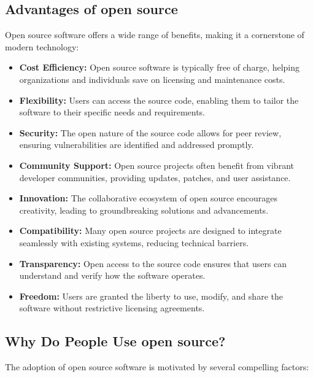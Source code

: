 \cite{opensource_what_is}

\subsection{Advantages of open source}

Open source software offers a wide range of benefits, making it a cornerstone of modern technology:

\begin{itemize}
    \item \textbf{Cost Efficiency:} Open source software is typically free of charge, helping organizations and individuals save on licensing and maintenance costs.
    \item \textbf{Flexibility:} Users can access the source code, enabling them to tailor the software to their specific needs and requirements.
    \item \textbf{Security:} The open nature of the source code allows for peer review, ensuring vulnerabilities are identified and addressed promptly.
    \item \textbf{Community Support:} Open source projects often benefit from vibrant developer communities, providing updates, patches, and user assistance.
    \item \textbf{Innovation:} The collaborative ecosystem of open source encourages creativity, leading to groundbreaking solutions and advancements.
    \item \textbf{Compatibility:} Many open source projects are designed to integrate seamlessly with existing systems, reducing technical barriers.
    \item \textbf{Transparency:} Open access to the source code ensures that users can understand and verify how the software operates.
    \item \textbf{Freedom:} Users are granted the liberty to use, modify, and share the software without restrictive licensing agreements.
\end{itemize}

\cite{advantages-of-open-source-software}
\cite{Pros-and-cons-of-open-source-software}

\subsection{Why Do People Use open source?}

The adoption of open source software is motivated by several compelling factors:

